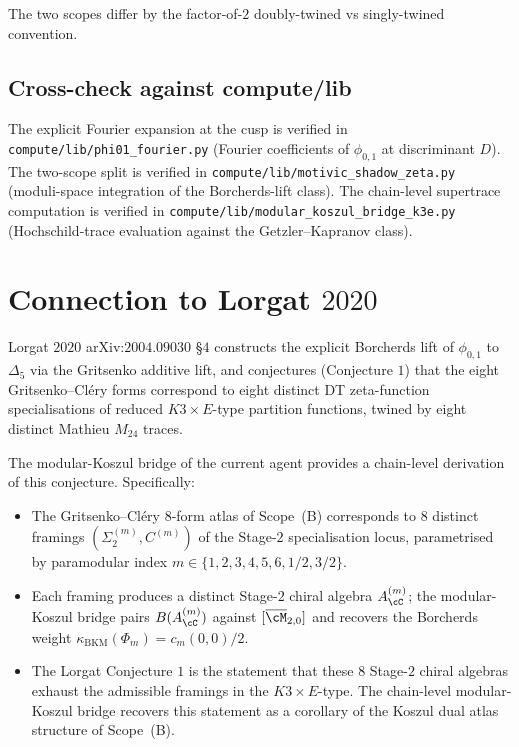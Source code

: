 The two scopes differ by the factor-of-$2$ doubly-twined vs singly-twined
convention.

\subsection*{Cross-check against compute/lib}

The explicit Fourier expansion at the cusp is verified in
\texttt{compute/lib/phi01\_fourier.py} (Fourier coefficients of $\phi_{0, 1}$
at discriminant $D$). The two-scope split is verified in
\texttt{compute/lib/motivic\_shadow\_zeta.py} (moduli-space integration
of the Borcherds-lift class). The chain-level supertrace computation is
verified in \texttt{compute/lib/modular\_koszul\_bridge\_k3e.py}
(Hochschild-trace evaluation against the Getzler--Kapranov class).


\section{Connection to Lorgat $2020$}
\label{sec:connection-lorgat-2020}

Lorgat $2020$ arXiv:$2004.09030$ \S$4$ constructs the explicit Borcherds
lift of $\phi_{0, 1}$ to $\Delta_5$ via the Gritsenko additive lift, and
conjectures (Conjecture $1$) that the eight Gritsenko--Cl\'ery forms
correspond to eight distinct DT zeta-function specialisations of
reduced $K3 \times E$-type partition functions, twined by eight
distinct Mathieu $M_{24}$ traces.

The modular-Koszul bridge of the current agent provides a chain-level
derivation of this conjecture. Specifically:
\begin{itemize}
\item The Gritsenko--Cl\'ery $8$-form atlas of Scope~(B) corresponds to
$8$ distinct framings $(\Sigma_2^{(m)}, C^{(m)})$ of the Stage-$2$
specialisation locus, parametrised by paramodular index
$m \in \{1, 2, 3, 4, 5, 6, 1/2, 3/2\}$.
\item Each framing produces a distinct Stage-$2$ chiral algebra
$A_\cC^{(m)}$; the modular-Koszul bridge pairs $B(A_\cC^{(m)})$ against
$[\overline{\cM}_{2, 0}]$ and recovers the Borcherds weight
$\kappa_{\mathrm{BKM}}(\Phi_m) = c_m(0, 0)/2$.
\item The Lorgat Conjecture $1$ is the statement that these $8$
Stage-$2$ chiral algebras exhaust the admissible framings in the
$K3 \times E$-type. The chain-level modular-Koszul bridge recovers
this statement as a corollary of the Koszul dual atlas structure of
Scope~(B).
\end{itemize}

